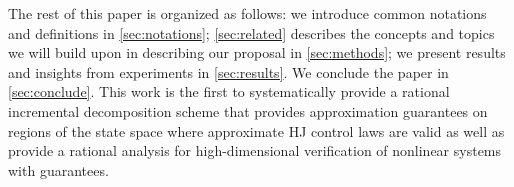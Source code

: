 
The rest of this paper is organized as follows: we introduce common notations and definitions in \autoref{sec:notations}; \autoref{sec:related} describes the concepts and topics we will build upon in describing our proposal in \autoref{sec:methods}; we present results and insights from experiments in \autoref{sec:results}. We  conclude the paper in \autoref{sec:conclude}. This work is the first to systematically provide a rational incremental decomposition scheme that provides approximation guarantees on regions of the state space where approximate HJ control laws are valid as well as provide a rational analysis for high-dimensional verification of nonlinear systems with guarantees.  %